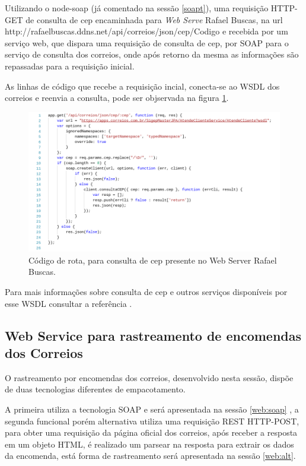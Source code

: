 \documentclass[a4paper, 12pt]{article}
\begin{document}
Utilizando o node-soap (já comentado na sessão \ref{soapt}), uma requisição HTTP-GET de consulta de cep encaminhada para \textit{Web Serve} Rafael Buscas, na url http://rafaelbuscas.ddns.net/api/correios/json/cep/Codigo e recebida por um serviço web, que dispara uma requisição de consulta de cep, por SOAP para o serviço de consulta dos correios, onde após retorno da mesma as informações são repassadas para a requisição inicial.

As linhas de código que recebe a requisição incial, conecta-se ao WSDL dos correios e reenvia a consulta, pode ser objservada na figura \ref{c22}. 

\begin{figure}[H]
	\centering
	\includegraphics[scale=0.48]{Imagens/codigocep.png}
	\caption{Código de rota, para consulta de cep presente no Web Server Rafael Buscas.}
	\label{c22}
\end{figure}

Para mais informações sobre consulta de cep e outros serviços disponíveis por esse WSDL consultar a referência \cite{correiosapp}.

\subsection{Web Service para rastreamento de encomendas dos Correios}
O rastreamento por encomendas dos correios, desenvolvido nesta sessão, dispõe de duas tecnologias diferentes de empacotamento.

A primeira utiliza a tecnologia SOAP e será apresentada na sessão \ref{web:soap} , a segunda funcional porém alternativa utiliza uma requisição REST HTTP-POST, para obter uma requisição da página oficial dos correios, após receber a resposta em um objeto HTML, é realizado um parsear na resposta para extrair os dados da encomenda, está forma de rastreamento será apresentada na sessão \ref{web:alt}.
\end{document}
